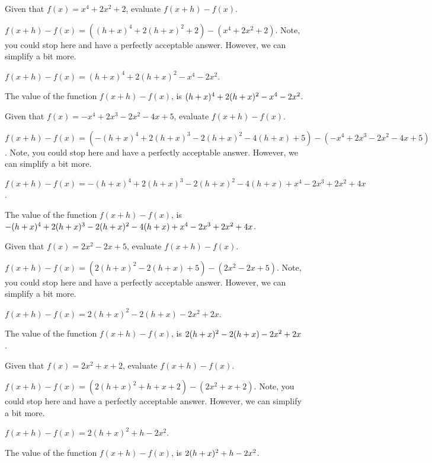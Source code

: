 \begin{shuffle}
\begin{exercise}
Given that $f(x)=x^4+2 x^2+2$, evaluate $f(x+h)-f(x)$.
\begin{solution}
\begin{hint}
$f(x+h)-f(x)=((h+x)^4+2 (h+x)^2+2)-(x^4+2 x^2+2)$. Note, you could stop here and have a perfectly acceptable answer. However, we can simplify a bit more.
\end{hint}
\begin{hint}
$f(x+h)-f(x)=(h+x)^4+2 (h+x)^2-x^4-2 x^2$.
\end{hint}
The value of the function $f(x+h)-f(x)$, is ${(h+x)^4+2 (h+x)^2-x^4-2 x^2}$.
\end{solution}
\end{exercise}

\begin{exercise}
Given that $f(x)=-x^4+2 x^3-2 x^2-4 x+5$, evaluate $f(x+h)-f(x)$.
\begin{solution}
\begin{hint}
$f(x+h)-f(x)=(-(h+x)^4+2 (h+x)^3-2 (h+x)^2-4 (h+x)+5)-(-x^4+2 x^3-2 x^2-4 x+5)$. Note, you could stop here and have a perfectly acceptable answer. However, we can simplify a bit more.
\end{hint}
\begin{hint}
$f(x+h)-f(x)=-(h+x)^4+2 (h+x)^3-2 (h+x)^2-4 (h+x)+x^4-2 x^3+2 x^2+4 x$.
\end{hint}
The value of the function $f(x+h)-f(x)$, is ${-(h+x)^4+2 (h+x)^3-2 (h+x)^2-4 (h+x)+x^4-2 x^3+2 x^2+4 x}$.
\end{solution}
\end{exercise}

\begin{exercise}
Given that $f(x)=2 x^2-2 x+5$, evaluate $f(x+h)-f(x)$.
\begin{solution}
\begin{hint}
$f(x+h)-f(x)=(2 (h+x)^2-2 (h+x)+5)-(2 x^2-2 x+5)$. Note, you could stop here and have a perfectly acceptable answer. However, we can simplify a bit more.
\end{hint}
\begin{hint}
$f(x+h)-f(x)=2 (h+x)^2-2 (h+x)-2 x^2+2 x$.
\end{hint}
The value of the function $f(x+h)-f(x)$, is ${2 (h+x)^2-2 (h+x)-2 x^2+2 x}$.
\end{solution}
\end{exercise}

\begin{exercise}
Given that $f(x)=2 x^2+x+2$, evaluate $f(x+h)-f(x)$.
\begin{solution}
\begin{hint}
$f(x+h)-f(x)=(2 (h+x)^2+h+x+2)-(2 x^2+x+2)$. Note, you could stop here and have a perfectly acceptable answer. However, we can simplify a bit more.
\end{hint}
\begin{hint}
$f(x+h)-f(x)=2 (h+x)^2+h-2 x^2$.
\end{hint}
The value of the function $f(x+h)-f(x)$, is ${2 (h+x)^2+h-2 x^2}$.
\end{solution}
\end{exercise}


\end{shuffle}
